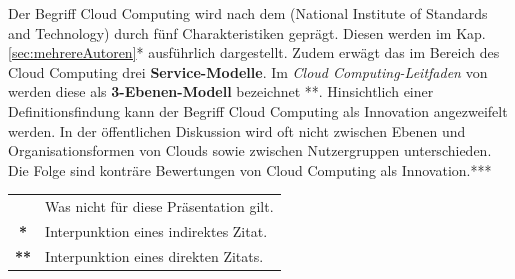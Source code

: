 \documentclass[xlevel, hyperref, nat, mp]{wise}
\begin{document}
Der Begriff {\sc Cloud Computing} wird nach dem \citeauthor{nist11} {\sc (National Institute of Standards and Technology)} durch fünf Charakteristiken geprägt. Diesen werden  im Kap. \ref{sec:mehrereAutoren}* ausführlich dargestellt. Zudem erwägt das \citeauthor{nist11} im Bereich des Cloud Computing  drei {\bf Service-Modelle}. Im {\it Cloud Computing-Leitfaden} von \citeauthor{bitcom09}  werden diese als {\bf 3-Ebenen-Modell} bezeichnet **. Hinsichtlich einer Definitionsfindung kann der Begriff {\sc Cloud Computing} als Innovation angezweifelt werden. \glqq In der öffentlichen Diskussion wird oft nicht zwischen Ebenen und Organisationsformen von Clouds sowie zwischen Nutzergruppen unterschieden. Die Folge sind konträre Bewertungen von Cloud Computing als Innovation.\grqq {}*** \\

\begin{tabular}{c l}
{\bf *} & Was nicht für diese Präsentation gilt.\\
{\bf **} & Interpunktion eines indirektes Zitat. \\
{\bf ***} & Interpunktion eines direkten Zitats. 
\end{tabular}\\



\begin{appendix}  
  \listoftables

  \listofabbreviations
  
  
 
\end{appendix}
\end{document}
